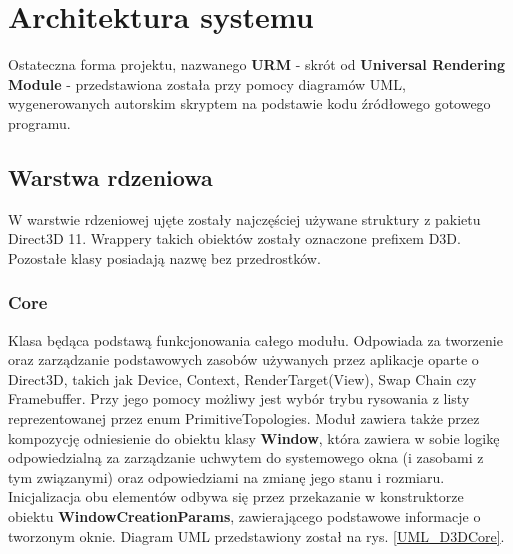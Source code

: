 \chapter{Architektura systemu}
\label{chapter_System_Architecture}
	Ostateczna forma projektu, nazwanego \textbf{URM} - skrót od \textbf{Universal Rendering Module} - przedstawiona została przy pomocy diagramów UML, wygenerowanych autorskim skryptem na podstawie kodu źródłowego gotowego programu.

\section{Warstwa rdzeniowa}
	W warstwie rdzeniowej ujęte zostały najczęściej używane struktury z pakietu Direct3D 11. Wrappery takich obiektów zostały oznaczone prefixem D3D. Pozostałe klasy posiadają nazwę bez przedrostków.

\subsection{Core}
	Klasa będąca podstawą funkcjonowania całego modułu. 
	Odpowiada za tworzenie oraz zarządzanie podstawowych zasobów używanych przez aplikacje oparte o Direct3D, takich jak Device, Context, RenderTarget(View), Swap Chain czy Framebuffer. Przy jego pomocy możliwy jest wybór trybu rysowania z listy reprezentowanej przez enum PrimitiveTopologies.
	Moduł zawiera także przez kompozycję odniesienie do obiektu klasy \textbf{Window}, która zawiera w sobie logikę odpowiedzialną za zarządzanie uchwytem do systemowego okna (i zasobami z tym związanymi) oraz odpowiedziami na zmianę jego stanu i rozmiaru.
	Inicjalizacja obu elementów odbywa się przez przekazanie w konstruktorze obiektu \textbf{WindowCreationParams}, zawierającego podstawowe informacje o tworzonym oknie.
	Diagram UML przedstawiony został na rys. \ref{UML_D3DCore}.
	
	\vfill
	\clearpage
	

